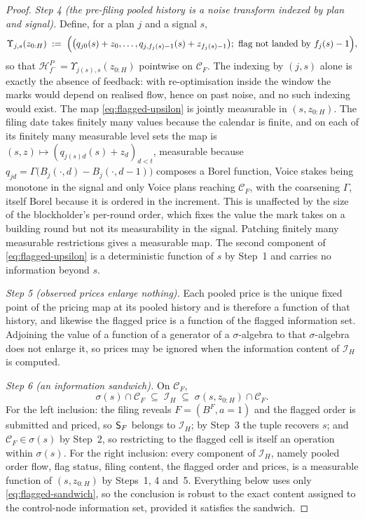 \begin{proof}
\emph{Step 4 (the pre-filing pooled history is a noise transform indexed by plan and signal).}
Define, for a plan $j$ and a signal $s$,
\begin{equation}
\label{eq:flagged-upsilon}
\Upsilon_{j,s}(z_{0:H}) \;:=\;
  \Bigl( \bigl(q_{j0}(s)+z_0,\dots,q_{j,f_j(s)-1}(s)+z_{f_j(s)-1}\bigr);\ \text{flag not landed by }
  f_j(s)-1 \Bigr),
\end{equation}
so that $\mathcal H_{f^-}^P=\Upsilon_{j(s),s}(z_{0:H})$ pointwise on $\mathcal C_F$. The indexing by
$(j,s)$ alone is exactly the absence of feedback: with re-optimisation inside the window the marks
would depend on realised flow, hence on past noise, and no such indexing would exist. The map
\eqref{eq:flagged-upsilon} is jointly measurable in $(s,z_{0:H})$. The filing date takes finitely
many values because the calendar is finite, and on each of its finitely many measurable level sets
the map is $(s,z)\mapsto(q_{j(s)d}(s)+z_d)_{d<t}$, measurable because
$q_{jd}=\Gamma\bigl(B_j(\cdot,d)-B_j(\cdot,d-1)\bigr)$ composes a Borel function, Voice stakes being
monotone in the signal and only Voice plans reaching $\mathcal C_F$, with the coarsening $\Gamma$,
itself Borel because it is ordered in the increment. This is unaffected by the size of the
blockholder's per-round order, which fixes the value the mark takes on a building round but not its
measurability in the signal. Patching finitely many measurable restrictions gives a measurable map.
The second component of \eqref{eq:flagged-upsilon} is a deterministic function of $s$ by Step~1 and
carries no information beyond $s$.

\emph{Step 5 (observed prices enlarge nothing).} Each pooled price is the unique fixed point of the
pricing map at its pooled history and is therefore a function of that history, and likewise the
flagged price is a function of the flagged information set. Adjoining the value of a function of a
generator of a $\sigma$-algebra to that $\sigma$-algebra does not enlarge it, so prices may be
ignored when the information content of $\mathcal I_H$ is computed.

\emph{Step 6 (an information sandwich).} On $\mathcal C_F$,
\begin{equation}
\label{eq:flagged-sandwich}
\sigma(s) \cap \mathcal C_F \;\subseteq\; \mathcal I_H \;\subseteq\;
  \sigma(s,z_{0:H}) \cap \mathcal C_F .
\end{equation}
For the left inclusion: the filing reveals $F=(B^F,a{=}1)$ and the flagged order is submitted and
priced, so $\mathsf{S}_F$ belongs to $\mathcal I_H$; by Step~3 the tuple recovers $s$; and
$\mathcal C_F\in\sigma(s)$ by Step~2, so restricting to the flagged cell is itself an operation
within $\sigma(s)$. For the right inclusion: every component of $\mathcal I_H$, namely pooled order
flow, flag status, filing content, the flagged order and prices, is a measurable function of
$(s,z_{0:H})$ by Steps~1, 4 and~5. Everything below uses only \eqref{eq:flagged-sandwich}, so the
conclusion is robust to the exact content assigned to the control-node information set, provided it
satisfies the sandwich.


\end{proof}
